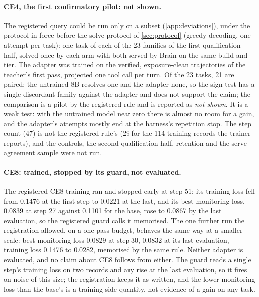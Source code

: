\paragraph{CE4, the first confirmatory pilot: not shown.} The registered query could be run only on a subset (\cref{app:deviations}), under the protocol in force before the solve protocol of \cref{sec:protocol} (greedy decoding, one attempt per task): one task of each of the 23 families of the first qualification half, solved once by each arm with both served by Brain on the same build and tier. The adapter was trained on the verified, exposure-clean trajectories of the teacher's first pass, projected one tool call per turn. Of the 23 tasks, 21 are paired; the untrained 8B resolves one and the adapter none, so the sign test has a single discordant family against the adapter and does not support the claim; the comparison is a pilot by the registered rule and is reported as \emph{not shown}. It is a weak test: with the untrained model near zero there is almost no room for a gain, and the adapter's attempts mostly end at the harness's repetition stop. The step count (47) is not the registered rule's (29 for the 114 training records the trainer reports), and the controls, the second qualification half, retention and the serve-agreement sample were not run.

\paragraph{CE8: trained, stopped by its guard, not evaluated.} The registered CE8 training ran
and stopped early at step 51: its training loss fell from 0.1476 at the first
step to 0.0221 at the last, and its best monitoring loss, 0.0839 at step 27 against 0.1101 for the
base, rose to 0.0867 by the last evaluation, so the registered guard calls it memorised.
The one further run the registration allowed, on a one-pass budget, behaves the same way at a
smaller scale: best monitoring loss 0.0829 at step 30, 0.0832 at its last evaluation, training loss
0.1476 to 0.0282, memorised by the same rule. Neither adapter is evaluated, and no claim
about CE8 follows from either. The guard reads a single step's training loss on two records and any
rise at the last evaluation, so it fires on noise of this size; the registration keeps it as
written, and the lower monitoring loss than the base's is a training-side quantity, not evidence of
a gain on any task.

